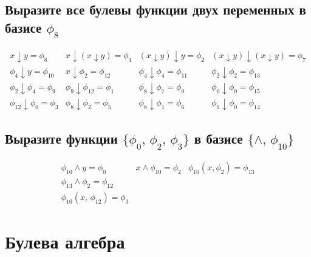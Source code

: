 \documentclass[12pt,a4paper]{article}
\theoremstyle{plain}
\theoremstyle{definition}
\theoremstyle{remark}
\numberwithin{equation}{section}
\begin{document}
\subsection{Выразите все булевы функции двух переменных в базисе $\phi_8$}

\begin{equation*}
  \begin{matrix}
    x \downarrow y = \phi_8 &
    x \downarrow (x \downarrow y) = \phi_4  &
    (x \downarrow y) \downarrow y = \phi_2 &
    (x \downarrow y) \downarrow (x \downarrow y) = \phi_7 \\
    \phi_4 \downarrow y = \phi_{10} &
    x \downarrow \phi_2 = \phi_{12} &
    \phi_4 \downarrow \phi_4 = \phi_{11} &
    \phi_2 \downarrow \phi_2 = \phi_{13} \\
    \phi_2 \downarrow \phi_4 = \phi_9 &
    \phi_9 \downarrow \phi_{12} = \phi_1 &
    \phi_8 \downarrow \phi_7 = \phi_0 &
    \phi_0 \downarrow \phi_0 = \phi_{15} \\
    \phi_{12} \downarrow \phi_0 = \phi_3 &
    \phi_8 \downarrow \phi_2 = \phi_5 &
    \phi_8 \downarrow \phi_1 = \phi_6 & 
    \phi_1 \downarrow \phi_0 = \phi_{14}
  \end{matrix}
\end{equation*}

\subsection{Выразите функции $\{\phi_0,\,\phi_2,\,\phi_3\}$ в базисе $\{\land,\,\phi_{10}\}$} 

\begin{equation*}
  \begin{matrix}
    \phi_{10} \land y = \phi_0 & 
    x \land \phi_{10} = \phi_2 & 
    \phi_{10}(x, \phi_{2}) = \phi_{13} \\
    \phi_{13} \land \phi_{2} = \phi_{12} \\
    \phi_{10}(x,\, \phi_{12}) = \phi_3
  \end{matrix}
\end{equation*}

\section{Булева алгебра}
\end{document}
